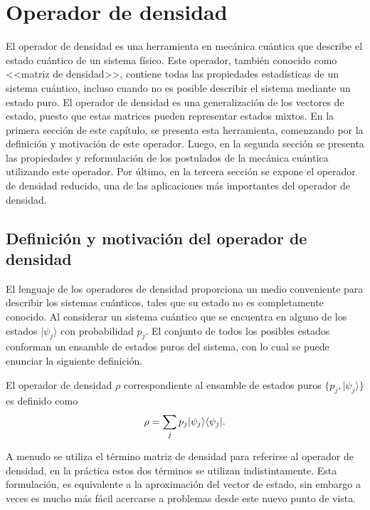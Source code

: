 \chapter{Operador de densidad}\label{OpDensidad}
El operador de densidad es una herramienta en mecánica cuántica que describe el
estado cuántico de un sistema físico. Este operador, también conocido como
<<matriz de densidad>>, contiene todas las propiedades estadísticas de un
sistema cuántico, incluso cuando no es posible describir el sistema mediante un
estado puro. El operador de densidad es una generalización de los vectores de
estado, puesto que estas matrices pueden representar estados mixtos.
En la primera sección de este capítulo, se presenta esta
herramienta, comenzando por la definición y motivación de este operador. Luego,
en la segunda sección  se presenta las propiedades y reformulación de los
postulados de la mecánica cuántica utilizando este operador. Por último, en la
tercera sección se expone el operador de densidad reducido, una de las
aplicaciones más importantes del operador de densidad.

\section{Definición y motivación  del operador de densidad} %
El lenguaje de los operadores de densidad proporciona un  medio conveniente
para describir los sistemas cuánticos, tales que su estado no es completamente
conocido. Al considerar un sistema cuántico que se encuentra en alguno de los
estados $|\psi_j \rangle $ con probabilidad $p_j$. El conjunto de todos los
posibles estados conforman un ensamble de estados puros del sistema, con lo
cual se puede enunciar la siguiente definición. 

\begin{definition} El operador de densidad
$\rho$ correspondiente al ensamble de estados puros $\{p_j,|\psi_j \rangle \}$
es definido como {\cite{wilde2011classical}}
  	\begin{equation}{\label{defdensityoperator}}
  		\rho=\sum_{j}p_j|\psi_j\rangle \langle \psi_j|.
  	\end{equation}
\end{definition}
A menudo se utiliza el término matriz de densidad para referirse al operador de
densidad, en la práctica estos dos términos se utilizan indistintamente. Esta
formulación, es equivalente a la aproximación del vector de estado, sin embargo
a veces es mucho más fácil acercarse a problemas desde este nuevo punto de
vista.
 
